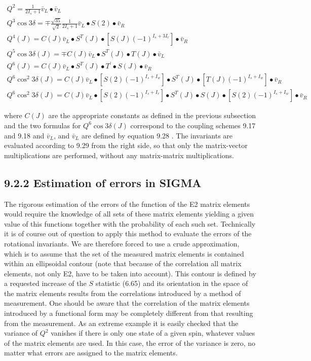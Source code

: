 \documentclass[10pt]{article}
\begin{document}
\begin{gather*}
Q^{2}=\frac{1}{2 I_{s}+1} \bar{v}_{L} \bullet \bar{v}_{L}  \tag{9.29a}\\
Q^{3} \cos 3 \delta=\mp \frac{\sqrt{35}}{\sqrt{2}} \frac{1}{2 I_{s}+1} \bar{v}_{L} \bullet S(2) \bullet \bar{v}_{R}  \tag{9.29b}\\
Q^{4}(J)=C(J) \bar{v}_{L} \bullet S^{T}(J) \bullet\left[S(J)(-1)^{I_{s}+3 I_{r}}\right] \bullet \bar{v}_{R}  \tag{9.29c}\\
Q^{5} \cos 3 \delta(J)=\mp C(J) \bar{v}_{L} \bullet S^{T}(J) \bullet T(J) \bullet \bar{v}_{L}  \tag{9.29~d}\\
Q^{6}(J)=C(J) \bar{v}_{L} \bullet S^{T}(J) \bullet T^{\prime} \bullet S(J) \bullet \bar{v}_{R}  \tag{9.29e}\\
Q^{6} \cos ^{2} 3 \delta(J)=C(J) \bar{v}_{L} \bullet\left[S(2)(-1)^{I_{s}+I_{w}}\right] \bullet S^{T}(J) \bullet\left[T(J)(-1)^{I_{s}+I_{w}}\right] \bullet \bar{v}_{R}  \tag{9.29f}\\
Q^{6} \cos ^{2} 3 \delta(J)=C(J) \bar{v}_{L} \bullet\left[S(2)(-1)^{I_{s}+I_{r}}\right] \bullet S^{T}(J) \bullet S(J) \bullet\left[S(2)(-1)^{I_{s}+I_{w}}\right] \bullet \bar{v}_{R} \tag{9.29~g}
\end{gather*}


where $C(J)$ are the appropriate constants as defined in the previous subsection and the two formulas for $Q^{6} \cos 3 \delta(J)$ correspond to the coupling schemes 9.17 and 9.18 and $\bar{v}_{L}$, and $\bar{v}_{L}$ are defined by equation 9.28 . The invariants are evaluated according to 9.29 from the right side, so that only the matrix-vector multiplications are performed, without any matrix-matrix multiplications.

\subsection*{9.2.2 Estimation of errors in SIGMA}
The rigorous estimation of the errors of the function of the E2 matrix elements would require the knowledge of all sets of these matrix elements yielding a given value of this functions together with the probability of each such set. Technically it is of course out of question to apply this method to evaluate the errors of the rotational invariants. We are therefore forced to use a crude approximation, which is to assume that the set of the measured matrix elements is contained within an ellipsoidal contour (note that because of the correlation all matrix elements, not only E2, have to be taken into account). This contour is defined by a requested increase of the $S$ statistic (6.65) and its orientation in the space of the matrix elements results from the correlations introduced by a method of measurement. One should be aware that the correlation of the matrix elements introduced by a functional form may be completely different from that resulting from the measurement. As an extreme example it is easily checked that the variance of $Q^{2}$ vanishes if there is only one state of a given spin, whatever values of the matrix elements are used. In this case, the error of the variance is zero, no matter what errors are assigned to the matrix elements.
\end{document}
